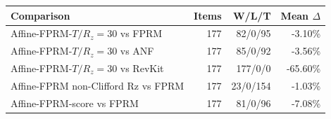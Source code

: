 \begin{tabular}{lrrr}
\toprule
Comparison & Items & W/L/T & Mean $\Delta$ \\
\midrule
Affine-FPRM-$T/R_z=30$ vs FPRM & 177 & 82/0/95 & -3.10\% \\
Affine-FPRM-$T/R_z=30$ vs ANF & 177 & 85/0/92 & -3.56\% \\
Affine-FPRM-$T/R_z=30$ vs RevKit & 177 & 177/0/0 & -65.60\% \\
Affine-FPRM non-Clifford Rz vs FPRM & 177 & 23/0/154 & -1.03\% \\
Affine-FPRM-score vs FPRM & 177 & 81/0/96 & -7.08\% \\
\bottomrule
\end{tabular}
